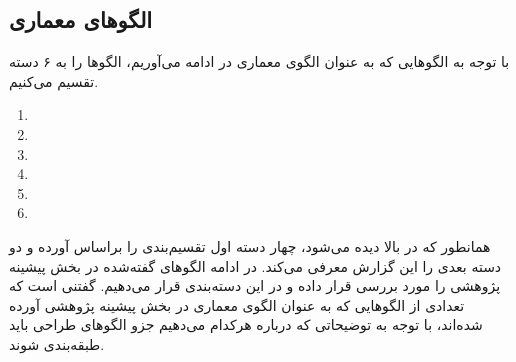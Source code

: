 \subsection{الگوهای معماری}
\begin{RTL}
با توجه به الگوهایی که به عنوان الگوی معماری در ادامه می‌آوریم،
الگوها را به ۶ دسته تقسیم می‌کنیم.
\end{RTL}
\begin{enumerate}
    \item {}
    \item {}
    \item {}
    \item {}
    \item {}
    \item {}
\end{enumerate}
\begin{RTL}
همانطور که در بالا دیده می‌شود، چهار دسته اول تقسیم‌بندی را براساس
\cite{ref6} آورده و دو دسته بعدی را این گزارش معرفی می‌کند.
در ادامه الگوهای گفته‌شده در بخش پیشینه پژوهشی را مورد بررسی
قرار داده و در این دسته‌بندی قرار می‌دهیم. گفتنی است که
تعدادی از الگوهایی که به عنوان الگوی معماری در بخش پیشینه
پژوهشی آورده شده‌اند، با توجه به توضیحاتی که درباره هرکدام می‌دهیم جزو الگوهای
طراحی باید طبقه‌بندی شوند.
\end{RTL}
